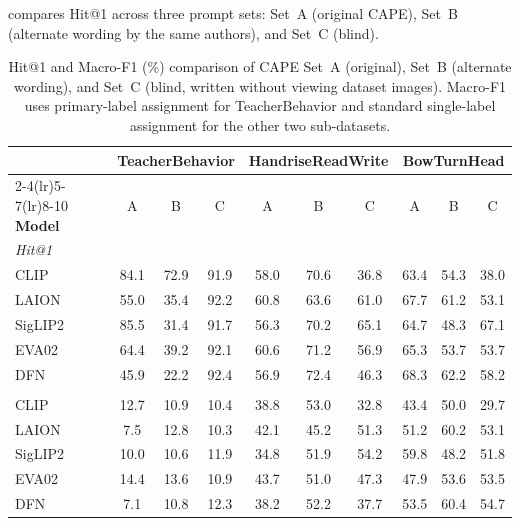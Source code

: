 \documentclass[symmetry,article,submit,pdftex,moreauthors]{Definitions/mdpi}
\begin{document}
 compares Hit@1 across three prompt sets: Set~A (original CAPE), Set~B (alternate wording by the same authors), and Set~C (blind).

\begin{table}[H]
\caption{Hit@1 and Macro-F1 (\%) comparison of CAPE Set~A (original), Set~B (alternate wording), and Set~C (blind, written without viewing dataset images). Macro-F1 uses primary-label assignment for TeacherBehavior and standard single-label assignment for the other two sub-datasets.}
\label{tab:blind_prompts}
\centering
\small
\setlength{\tabcolsep}{2.5pt}
\begin{tabular}{l cc@{~~}c cc@{~~}c cc@{~~}c}
\toprule
 & \multicolumn{3}{c}{\textbf{TeacherBehavior}} & \multicolumn{3}{c}{\textbf{HandriseReadWrite}} & \multicolumn{3}{c}{\textbf{BowTurnHead}} \\
\cmidrule(lr){2-4}\cmidrule(lr){5-7}\cmidrule(lr){8-10}
\textbf{Model} & A & B & C & A & B & C & A & B & C \\
\midrule
\multicolumn{10}{l}{\textit{Hit@1}} \\
CLIP & 84.1 & 72.9 & 91.9 & 58.0 & 70.6 & 36.8 & 63.4 & 54.3 & 38.0 \\
LAION & 55.0 & 35.4 & 92.2 & 60.8 & 63.6 & 61.0 & 67.7 & 61.2 & 53.1 \\
SigLIP2 & 85.5 & 31.4 & 91.7 & 56.3 & 70.2 & 65.1 & 64.7 & 48.3 & 67.1 \\
EVA02 & 64.4 & 39.2 & 92.1 & 60.6 & 71.2 & 56.9 & 65.3 & 53.7 & 53.7 \\
DFN & 45.9 & 22.2 & 92.4 & 56.9 & 72.4 & 46.3 & 68.3 & 62.2 & 58.2 \\
\addlinespace
\multicolumn{10}{l}{\textit{Macro-F1 (primary-label for TeacherBehavior; single-label accuracy-based for Handrise and BowTurn)}} \\
CLIP & 12.7 & 10.9 & 10.4 & 38.8 & 53.0 & 32.8 & 43.4 & 50.0 & 29.7 \\
LAION & 7.5 & 12.8 & 10.3 & 42.1 & 45.2 & 51.3 & 51.2 & 60.2 & 53.1 \\
SigLIP2 & 10.0 & 10.6 & 11.9 & 34.8 & 51.9 & 54.2 & 59.8 & 48.2 & 51.8 \\
EVA02 & 14.4 & 13.6 & 10.9 & 43.7 & 51.0 & 47.3 & 47.9 & 53.6 & 53.5 \\
DFN & 7.1 & 10.8 & 12.3 & 38.2 & 52.2 & 37.7 & 53.5 & 60.4 & 54.7 \\
\bottomrule
\end{tabular}
\end{table}
\end{document}
